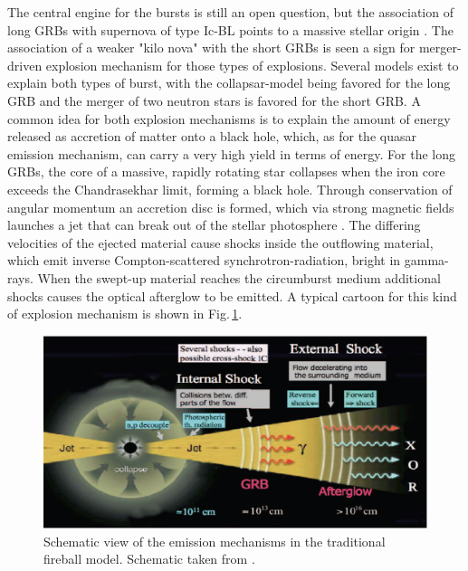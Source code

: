 The central engine for the bursts is still an open question, but the association
of long GRBs with supernova of type Ic-BL points to a massive stellar origin
\citep{Woosley2006, Hjorth2013}. The association of a weaker "kilo nova"
with
the short GRBs is seen a sign for merger-driven explosion mechanism
\citep{Tanvir2013} for those types of explosions. Several models exist to
explain both types of burst, with
the collapsar-model being favored for the long
GRB and the merger of two neutron stars is favored for the short GRB. A common idea
for both explosion mechanisms is
to explain the amount of energy released as
accretion of matter onto a black
hole, which, as for the quasar emission
mechanism, can carry a very high yield in
terms of energy. For the long GRBs,
the core of a massive, rapidly rotating star
collapses when the iron core
exceeds the Chandrasekhar limit, forming a black
hole. Through conservation of
angular momentum an accretion disc is formed,
which via strong magnetic fields
launches a jet that can break out of the stellar
photosphere
\citep{Woosley2006a}. The differing velocities of the ejected
material cause
shocks inside the outflowing material, which emit inverse
Compton-scattered
synchrotron-radiation, bright in gamma-rays.  When the
swept-up material reaches
the circumburst medium additional shocks causes the optical afterglow to be
emitted. A typical cartoon for this kind of
explosion mechanism is shown in Fig.\,\ref{fig:intro:grbglow}.

\begin{figure}[htb]
	
	\includegraphics[width=\textwidth]{gfx/grbmec}
	
	\caption{Schematic view of the emission mechanisms in the traditional fireball
model. Schematic taken from \citet{Meszaros2014}.}
	
	\label{fig:intro:grbglow}
\end{figure}

